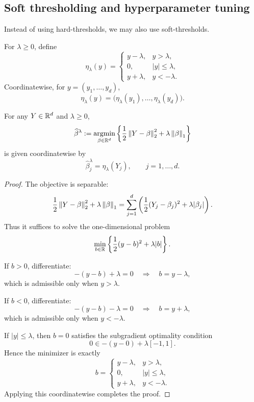 \subsection{Soft thresholding and hyperparameter tuning}
Instead of using hard-thresholds, we may also use soft-thresholds.
\begin{de}
For $\lambda\ge 0$, define
\[
\eta_\lambda(y)
=
\begin{cases}
y-\lambda, & y>\lambda,\\[4pt]
0, & |y|\le \lambda,\\[4pt]
y+\lambda, & y<-\lambda.
\end{cases}
\]
Coordinatewise, for $y=(y_1,\dots,y_d)$,
\[
\eta_\lambda(y)
=
\bigl(\eta_\lambda(y_1),\dots,\eta_\lambda(y_d)\bigr).
\]
\end{de}

\begin{prop}
For any $Y\in\mathbb{R}^d$ and $\lambda\ge 0$,
\[
\widehat\beta^\lambda
:=
\argmin_{\beta\in\R^d}
\left\{
\frac12 \norm{Y-\beta}_2^2 + \lambda \norm{\beta}_1
\right\}
\]
is given coordinatewise by
\[
\widehat\beta^\lambda_j=\eta_\lambda(Y_j),
\qquad j=1,\dots,d.
\]
\end{prop}

\begin{proof}
The objective is separable:
\[
\frac12 \left\lVert Y-\beta\right\rVert_2^2+\lambda\left\lVert\beta\right\rVert_1
=
\sum_{j=1}^d
\left(
\frac12 (Y_j-\beta_j)^2+\lambda |\beta_j|
\right).
\]
Thus it suffices to solve the one-dimensional problem
\[
\min_{b\in\mathbb{R}}
\left\{
\frac12 (y-b)^2+\lambda |b|
\right\}.
\]

If $b>0$, differentiate:
\[
-(y-b)+\lambda=0
\quad\Longrightarrow\quad
b=y-\lambda,
\]
which is admissible only when $y>\lambda$.

If $b<0$, differentiate:
\[
-(y-b)-\lambda=0
\quad\Longrightarrow\quad
b=y+\lambda,
\]
which is admissible only when $y<-\lambda$.

If $|y|\le \lambda$, then $b=0$ satisfies the subgradient optimality condition
\[
0\in -(y-0)+\lambda[-1,1].
\]
Hence the minimizer is exactly
\[
b=
\begin{cases}
y-\lambda, & y>\lambda,\\
0, & |y|\le \lambda,\\
y+\lambda, & y<-\lambda.
\end{cases}
\]
Applying this coordinatewise completes the proof.
\end{proof}



